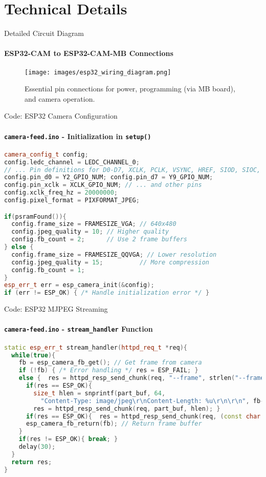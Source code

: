 \documentclass[10pt]{beamer}
\begin{document}
\section{Technical Details}

\begin{frame}{Detailed Circuit Diagram}
    \framesubtitle{ESP32-CAM to ESP32-CAM-MB Connections}
    \begin{figure}
        \centering
        \texttt{[image: images/esp32\_wiring\_diagram.png]}
        \caption{Essential pin connections for power, programming (via MB board), and camera operation.}
    \end{figure}
\end{frame}

\begin{frame}[fragile]{Code: ESP32 Camera Configuration}
    \framesubtitle{\texttt{camera-feed.ino} - Initialization in \texttt{setup()}}
    \begin{lstlisting}[language=C++, caption=Camera Settings]
camera_config_t config;
config.ledc_channel = LEDC_CHANNEL_0;
// ... Pin definitions for D0-D7, XCLK, PCLK, VSYNC, HREF, SIOD, SIOC, PWDN, RESET ...
config.pin_d0 = Y2_GPIO_NUM; config.pin_d7 = Y9_GPIO_NUM;
config.pin_xclk = XCLK_GPIO_NUM; // ... and other pins
config.xclk_freq_hz = 20000000;
config.pixel_format = PIXFORMAT_JPEG;

if(psramFound()){
  config.frame_size = FRAMESIZE_VGA; // 640x480
  config.jpeg_quality = 10; // Higher quality
  config.fb_count = 2;      // Use 2 frame buffers
} else {
  config.frame_size = FRAMESIZE_QQVGA; // Lower resolution
  config.jpeg_quality = 15;          // More compression
  config.fb_count = 1;
}
esp_err_t err = esp_camera_init(&config);
if (err != ESP_OK) { /* Handle initialization error */ }
    \end{lstlisting}
\end{frame}

\begin{frame}[fragile]{Code: ESP32 MJPEG Streaming}
    \framesubtitle{\texttt{camera-feed.ino} - \texttt{stream\_handler} Function}
    \begin{lstlisting}[language=C++, caption=MJPEG Frame Send Loop]
static esp_err_t stream_handler(httpd_req_t *req){
  while(true){
    fb = esp_camera_fb_get(); // Get frame from camera
    if (!fb) { /* Error handling */ res = ESP_FAIL; }
    else {  res = httpd_resp_send_chunk(req, "--frame", strlen("--frame"));
      if(res == ESP_OK){
        size_t hlen = snprintf(part_buf, 64, 
          "Content-Type: image/jpeg\r\nContent-Length: %u\r\n\r\n", fb->len);
        res = httpd_resp_send_chunk(req, part_buf, hlen); }
      if(res == ESP_OK){  res = httpd_resp_send_chunk(req, (const char *)fb->buf, fb->len);}
      esp_camera_fb_return(fb); // Return frame buffer
    }
    if(res != ESP_OK){ break; }
    delay(30);
  }
  return res;
}
    \end{lstlisting}
\end{frame}
\end{document}

